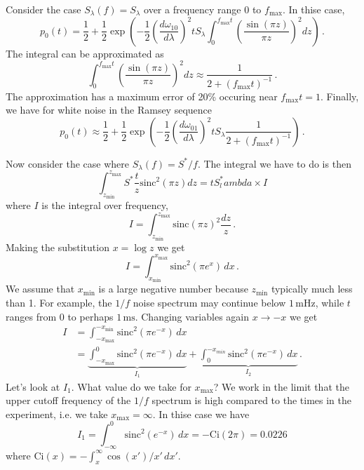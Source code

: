 Consider the case $S_{\lambda}(f) = S_{\lambda}$ over a frequency range $0$ to $f_\text{max}$.
In thise case,
\begin{equation}
  p_0(t) = \frac{1}{2} + \frac{1}{2}\exp \left( -\frac{1}{2}\left( \frac{d\omega_{10}}{d\lambda} \right)^2 t S_{\lambda} \int_0^{f_\text{max}t} \left( \frac{\sin(\pi z)} {\pi z} \right)^2 dz \right) \, .
\end{equation}
The integral can be approximated as
\begin{equation}
  \int_0^{f_\text{max}t} \left( \frac{\sin(\pi z)}{\pi z} \right)^2 dz \approx \frac{1}{2+(f_{\text{max}}t)^{-1}} \, .
\end{equation}
The approximation has a maximum error of 20\% occuring near $f_{\text{max}}t = 1$. 
Finally, we have for white noise in the Ramsey sequence
\begin{equation}
  p_0(t) \approx \frac{1}{2} + \frac{1}{2} \exp \left( -\frac{1}{2} \left( \frac{d\omega_{01}}{d\lambda} \right)^2 t S_{\lambda} \frac{1}{2 + (f_{\text{max}}t)^{-1}} \right) \, .
\end{equation}



Now consider the case where $S_{\lambda}(f)=S^{*}/f$.
The integral we have to do is then
\begin{equation}
  \int_{z_\text{min}}^{z_\text{max}}S^{*}\frac{t}{z}\text{sinc}^2 \left(\pi z \right) dz
  = t S^*_lambda \times I
\end{equation}
where $I$ is the integral over frequency,
\begin{equation}
  I = \int_{z_{\text{min}}}^{z_{\text{max}}} \text{sinc}(\pi z)^{2}\frac{dz}{z} \, .
\end{equation}
Making the substitution $x=\log z$ we get
\begin{equation}
  I = \int_{x_\text{min}}^{x_\text{max}}\text{sinc}^2(\pi e^{x})\, dx \, .
\end{equation}
We assume that $x_\text{min}$ is a large negative number because $z_\text{min}$ typically much less than 1.
For example, the $1/f$ noise spectrum may continue below $1\,\text{mHz}$, while $t$ ranges from $0$ to perhaps $1\,\text{ms}$.
Changing variables again $x \rightarrow -x$ we get
\begin{align}
  I & = \int_{-x_\text{max}}^{-x_\text{min}}\text{sinc}^2 \left(\pi e^{-x}\right) \, dx\\
  & = \underbrace{\int_{-x_\text{max}}^0\text{sinc}^{2}\left(\pi e^{-x}\right)\, dx}_{I_1} + \underbrace{\int_0^{-x_{min}}\text{sinc}^2 \left(\pi e^{-x}\right) \, dx}_{I_2} \, .
\end{align}
Let's look at $I_1$.
What value do we take for $x_\text{max}$?
We work in the limit that the upper cutoff frequency of the $1/f$ spectrum is high compared to the times in the experiment, i.e. we take $x_\text{max}=\infty$.
In thise case we have
\begin{equation}
  I_1 = \int_{-\infty}^{0}\textrm{sinc}^{2}\left(e^{-x}\right)\, dx = -\text{Ci}(2\pi)=0.0226
\end{equation}
where $\text{Ci}(x) = -\int_{x}^{\infty}\cos(x')/x'\, dx'$.

